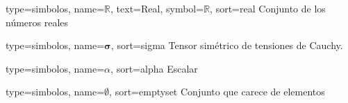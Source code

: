 

{
	type={simbolos},
	name={$\mathbb{R}$}, %
	text={Real}, %
	symbol={$\mathbb{R}$}, %
	sort={real} %
}
{Conjunto de los números reales} %

{
	type={simbolos},
	name={\ensuremath{\boldsymbol{\sigma}}}, %
	sort={sigma} %
}
{Tensor simétrico de tensiones de Cauchy.} %

{
	type={simbolos},
	name={$\alpha$},  %
	sort={alpha} %
} 
{Escalar} %


{
type={simbolos},
name={$\emptyset$}, %
sort={emptyset} %
}
{Conjunto que carece de elementos} %

